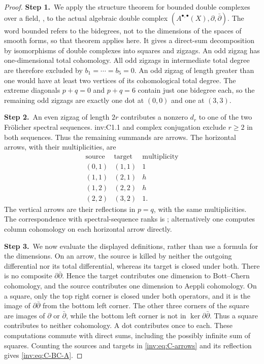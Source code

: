 \documentclass[11pt,a4paper]{article}
\theoremstyle{plain}
\theoremstyle{definition}
\begin{document}
\begin{proof}
\par\smallskip\noindent\textbf{Step 1.}\ We apply the structure theorem for bounded double complexes over a
field, \cite[Theorem 3]{Stelzig21}, to the actual algebraic double
complex $(A^{\bullet,\bullet}(X),\partial,\bar\partial)$.
The word bounded refers to the bidegrees, not to the dimensions of the
spaces of smooth forms, so that theorem applies here.  It gives a
direct-sum decomposition by isomorphisms of double complexes into
squares and zigzags.  An odd zigzag has one-dimensional total
cohomology.  All odd zigzags in intermediate total degree are therefore
excluded by $b_1=\cdots=b_5=0$.  An odd zigzag of length greater than
one would have at least two vertices of its cohomological total degree.
The extreme diagonals $p+q=0$ and $p+q=6$ contain just one bidegree
each, so the remaining odd zigzags are exactly one dot at $(0,0)$ and
one at $(3,3)$.

\par\smallskip\noindent\textbf{Step 2.}\ An even zigzag of length $2r$ contributes a nonzero $d_r$ to one of
the two Fr\"olicher spectral sequences.  inv:C1.1 and complex conjugation
exclude $r\ge2$ in both sequences.  Thus the remaining summands are
arrows.  The horizontal arrows, with their multiplicities, are
\begin{equation}\label{inv:eq:C-arrows}
\begin{array}{c|c|r}
\text{source}&\text{target}&\text{multiplicity}\\\hline
(0,1)&(1,1)&1\\
(1,1)&(2,1)&h\\
(1,2)&(2,2)&h\\
(2,2)&(3,2)&1.
\end{array}
\end{equation}
The vertical arrows are their reflections in $p=q$, with the same
multiplicities.  The correspondence with spectral-sequence ranks is
\cite[Proposition 6(1)]{Stelzig21}; alternatively one computes
column cohomology on each horizontal arrow directly.

\par\smallskip\noindent\textbf{Step 3.}\ We now evaluate the displayed definitions, rather than use a formula
for the dimensions.  On an arrow, the source is killed by neither
the outgoing differential nor its total differential, whereas its
target is closed under both.  There is no composite
$\partial\bar\partial$.  Hence the target contributes one dimension
to Bott--Chern cohomology, and the source contributes one dimension
to Aeppli cohomology.  On a square, only the top right corner is closed
under both operators, and it is the image of
$\partial\bar\partial$ from the bottom left corner.  The other
three corners of the square are images of $\partial$ or
$\bar\partial$, while the bottom left corner is not in
$\ker\partial\bar\partial$.  Thus a square contributes to neither
cohomology.  A dot contributes once to each.  These computations
commute with direct sums, including the possibly infinite sum of
squares.  Counting the sources and targets in \eqref{inv:eq:C-arrows}
and its reflection gives \eqref{inv:eq:C-BC-A}.


\end{proof}
\end{document}
